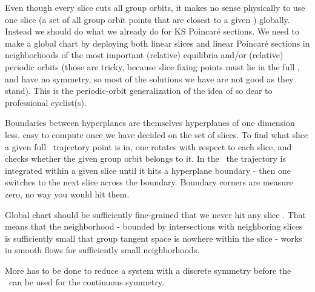Even though every slice cuts all group orbits, it makes no sense physically to
use one slice
(a set of all group orbit points that are closest to a given {\template})
globally. Instead we should do what we already do for KS Poincar\'e sections.
We need to make a global chart by deploying both linear slices and linear
Poincar\'e sections in neighborhoods of the most important (relative)
equilibria and/or (relative) periodic orbits (those are tricky, because
slice fixing points must lie in the full \statesp, and have no symmetry,
so most of the solutions we have are not good as they stand). This is the
periodic-orbit generalization of the idea of
so dear to professional cyclist(s).


Boundaries
between hyperplanes are themselves hyperplanes of one dimension less,
easy to compute once we have decided on the set of slices. To find
what slice a given full \statesp\ trajectory point is in, one rotates
with respect to each slice, and checks whether the given group orbit
belongs to it. In the \reducedsp\ the trajectory is integrated within a
given slice until it hits a hyperplane boundary - then one switches to
the next slice across the boundary. Boundary corners are measure zero, no
way you would hit them.

Global chart should be sufficiently fine-grained that we never hit any
slice {\sset}. That means that the neighborhood - bounded by
intersections with neighboring slices is sufficiently small that group
tangent space is nowhere within the slice - works in smooth flows
for sufficiently small neighborhoods.


More has to be done to reduce a system with a discrete
symmetry before the \mslices\ can be used for the continuous symmetry.
